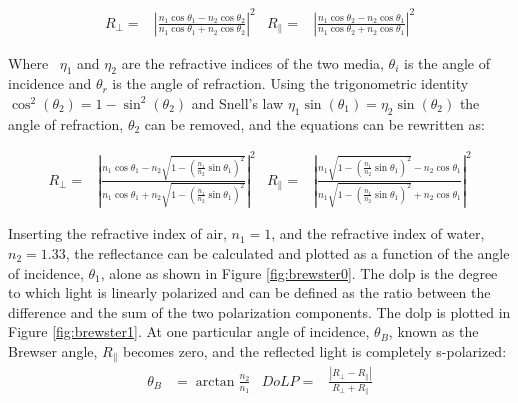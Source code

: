 \begin{align}
    R_\perp =     & \left|{\frac {n_{1}\cos \theta _1-n_{2}\cos \theta _2}{n_{1}\cos \theta _1+n_{2}\cos \theta _2}}\right|^{2}
                  & 
    R_\parallel = & \left|{\frac {n_{1}\cos \theta _2-n_{2}\cos \theta _1}{n_{1}\cos \theta _2+n_{2}\cos \theta _1}}\right|^{2}
\end{align}

Where  $\eta_1$ and $\eta_2$ are the refractive indices of the two media,
$\theta_i$ is the angle of incidence and $\theta_r$ is the angle of refraction.
Using the trigonometric identity $ \cos^2{\left(\theta_2 \right)} = 1- \sin^2{\left(\theta_2 \right)}$ and Snell's law $\eta_1 \sin{\left(\theta_1 \right)} = \eta_2 \sin{\left(\theta_2 \right)}$ the angle of refraction, $\theta_2$ can be removed, and the equations can be rewritten as:

\begin{align}
    R_\perp =     & \left|{\frac {n_{1}\cos \theta _1-n_{2}{\sqrt {1-\left({\frac {n_{1}}{n_{2}}}\sin \theta _1\right)^{2}}}}{n_{1}\cos \theta _1+n_{2}{\sqrt {1-\left({\frac {n_{1}}{n_{2}}}\sin \theta _1\right)^{2}}}}}\right|^{2}
                  & 
    R_\parallel = & \left|{\frac {n_{1}{\sqrt {1-\left({\frac {n_{1}}{n_{2}}}\sin \theta _1\right)^{2}}}-n_{2}\cos \theta _1}{n_{1}{\sqrt {1-\left({\frac {n_{1}}{n_{2}}}\sin \theta _1\right)^{2}}}+n_{2}\cos \theta _1}}\right|^{2}
\end{align}





Inserting the refractive index of air, $n_1 = 1$, and the refractive index of water, $n_2 = 1.33$, the reflectance can be calculated and plotted as a function of the angle of incidence, $\theta_1$, alone as shown in Figure \ref{fig:brewster0}.
The \gls{dolp} is the degree to which light is linearly polarized and can be defined as the ratio between the difference and the sum of the two polarization components.
The \gls{dolp} is plotted in Figure \ref{fig:brewster1}.
At one particular angle of incidence, $\theta_B$, known as the Brewser angle, $R_\parallel$ becomes zero, and the reflected light is completely s-polarized:
\begin{align}
    \theta_B & = \arctan{\frac{n_2}{n_1}} & DoLP= & \frac{\left | R_\perp - R_\parallel \right |}{R_\perp + R_\parallel}
\end{align}

